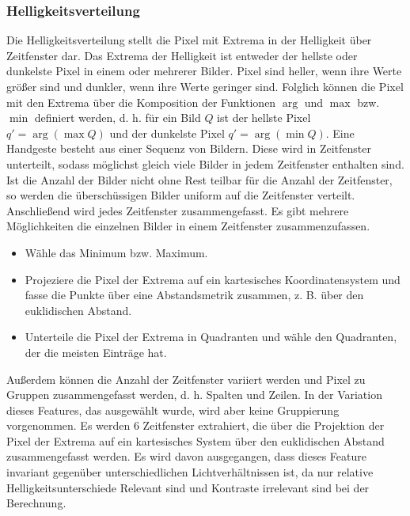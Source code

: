 \subsubsection{Helligkeitsverteilung}
Die Helligkeitsverteilung stellt die Pixel mit Extrema in der Helligkeit über Zeitfenster dar. Das Extrema der Helligkeit ist entweder der hellste oder dunkelste Pixel in einem oder mehrerer Bilder. Pixel
sind heller, wenn ihre Werte größer sind und dunkler, wenn ihre Werte geringer sind. Folglich können die Pixel mit den Extrema über die Komposition der Funktionen $\arg$ und $\max$ bzw. $\min$ definiert werden,
d. h. für ein Bild $Q$ ist der hellste Pixel $q' = \arg(\max Q)$ und der dunkelste Pixel $q' = \arg(\min Q)$.
\newline
\newline
Eine Handgeste besteht aus einer Sequenz von Bildern. Diese wird in Zeitfenster unterteilt, sodass möglichst gleich viele Bilder in jedem Zeitfenster enthalten sind. Ist die Anzahl der Bilder nicht ohne
Rest teilbar für die Anzahl der Zeitfenster, so werden die überschüssigen Bilder uniform auf die Zeitfenster verteilt. Anschließend wird jedes Zeitfenster zusammengefasst. Es gibt mehrere Möglichkeiten
die einzelnen Bilder in einem Zeitfenster zusammenzufassen.
\begin{itemize}
    \item Wähle das Minimum bzw. Maximum.
    \item Projeziere die Pixel der Extrema auf ein kartesisches Koordinatensystem und fasse die Punkte über eine Abstandsmetrik zusammen, z. B. über den euklidischen Abstand.
    \item Unterteile die Pixel der Extrema in Quadranten und wähle den Quadranten, der die meisten Einträge hat.
\end{itemize}
Außerdem können die Anzahl der Zeitfenster variiert werden und Pixel zu Gruppen zusammengefasst werden, d. h. Spalten und Zeilen. In der Variation dieses Features, das ausgewählt wurde, wird aber
keine Gruppierung vorgenommen. Es werden 6 Zeitfenster extrahiert, die über die Projektion der Pixel der Extrema auf ein kartesisches System über den euklidischen Abstand zusammengefasst werden.
\newline
\newline
Es wird davon ausgegangen, dass dieses Feature invariant gegenüber unterschiedlichen Lichtverhältnissen ist, da nur relative Helligkeitsunterschiede Relevant sind und Kontraste irrelevant sind bei der
Berechnung.

